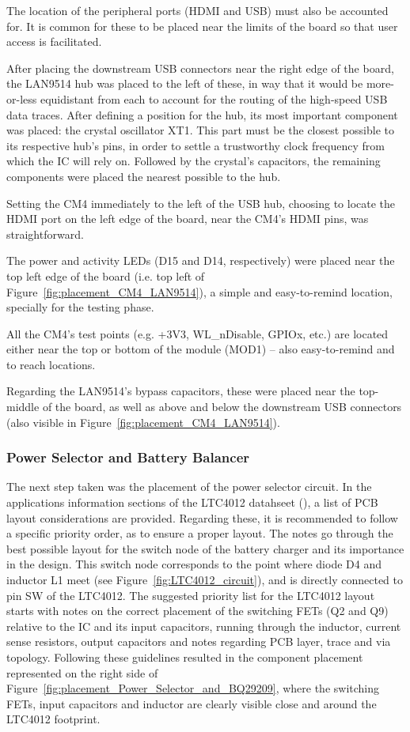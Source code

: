 The location of the peripheral ports (HDMI and USB) must also be accounted for. It is common for these to be placed near the limits of the board so that user access is facilitated.

After placing the downstream USB connectors near the right edge of the board, the LAN9514 hub was placed to the left of these, in way that it would be more-or-less equidistant from each to account for the routing of the high-speed USB data traces. After defining a position for the hub, its most important component was placed: the crystal oscillator XT1. This part must be the closest possible to its respective hub's pins, in order to settle a trustworthy clock frequency from which the IC will rely on. Followed by the crystal's capacitors, the remaining components were placed the nearest possible to the hub.

Setting the CM4 immediately to the left of the USB hub, choosing to locate the HDMI port on the left edge of the board, near the CM4's HDMI pins, was straightforward.

The power and activity LEDs (D15 and D14, respectively) were placed near the top left edge of the board (i.e. top left of Figure~\ref{fig:placement_CM4_LAN9514}), a simple and easy-to-remind location, specially for the testing phase.

All the CM4's test points (e.g. +3V3, WL\_nDisable, GPIOx, etc.) are located either near the top or bottom of the module (MOD1) -- also easy-to-remind and to reach locations.

Regarding the LAN9514's bypass capacitors, these were placed near the top-middle of the board, as well as above and below the downstream USB connectors (also visible in Figure~\ref{fig:placement_CM4_LAN9514}).


\subsubsection{Power Selector and Battery Balancer}\label{sec:5112_LTC4012_BQ29209}

The next step taken was the placement of the power selector circuit. In the applications information sections of the LTC4012 datahseet (\cite{LTC4012}), a list of PCB layout considerations are provided. Regarding these, it is recommended to follow a specific priority order, as to ensure a proper layout. The notes go through the best possible layout for the switch node of the battery charger and its importance in the design. This switch node corresponds to the point where diode D4 and inductor L1 meet (see Figure~\ref{fig:LTC4012_circuit}), and is directly connected to pin SW of the LTC4012. The suggested priority list for the LTC4012 layout starts with notes on the correct placement of the switching FETs (Q2 and Q9) relative to the IC and its input capacitors, running through the inductor, current sense resistors, output capacitors and notes regarding PCB layer, trace and via topology. Following these guidelines resulted in the component placement represented on the right side of Figure~\ref{fig:placement_Power_Selector_and_BQ29209}, where the switching FETs, input capacitors and inductor are clearly visible close and around the LTC4012 footprint.

